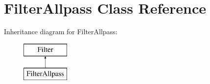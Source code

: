 \hypertarget{class_filter_allpass}{\section{Filter\-Allpass Class Reference}
\label{class_filter_allpass}
}
Inheritance diagram for Filter\-Allpass\-:\begin{figure}[H]
\begin{center}
\leavevmode
\includegraphics[height=2.000000cm]{class_filter_allpass}
\end{center}
\end{figure}
